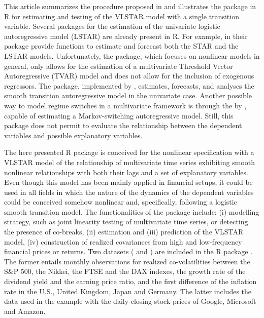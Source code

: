 This article summarizes the procedure proposed in \citet*{teraya14} and illustrates the  package in R for estimating and testing of the VLSTAR model with a single transition variable. Several packages for the estimation of the univariate logistic autoregressive model (LSTAR) are already present in R. For example, \citet*{tsdyn10} in their  package provide functions to estimate and forecast both the STAR and the LSTAR models. Unfortunately, the  package, which focuses on nonlinear models in general, only allows for the estimation of a multivariate Threshold Vector Autoregressive (TVAR) model and does not allow for the inclusion of exogenous regressors. The  package, implemented by \citet*{bal16}, estimates, forecasts, and analyses the smooth transition autoregressive model in the univariate case. Another possible way to model regime switches in a multivariate framework is through the  by \cite{MSBVAR}, capable of estimating a Markov-switching autoregressive model. Still, this package does not permit to evaluate the relationship between the dependent variables and possible explanatory variables.

The here presented R package  \citep{starvars20} is conceived for the nonlinear specification with a VLSTAR model of the relationship of multivariate time series exhibiting smooth nonlinear relationships with both their lags and a set of explanatory variables. Even though this model has been mainly applied in financial setups, it could be used in all fields in which the nature of the dynamics of the dependent variables could be conceived somehow nonlinear and, specifically, following a logistic smooth transition model. The functionalities of the  package include: (i) modelling strategy, such as joint linearity testing of multivariate time series, or detecting the presence of co-breaks, (ii) estimation and (iii) prediction of the VLSTAR model, (iv) construction of realized covariances from high and low-frequency financial prices or returns. Two datasets ( and ) are included in the R package . The former entails monthly observations for realized co-volatilities between the S\&P 500, the Nikkei, the FTSE and the DAX indexes, the growth rate of the dividend yield and the earning price ratio, and the first difference of the inflation rate in the U.S., United Kingdom, Japan and Germany. The latter includes the data used in the example with the daily closing stock prices of Google, Microsoft and Amazon.

